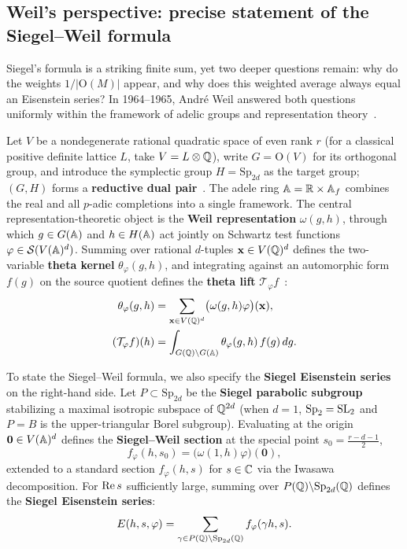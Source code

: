 \subsection{Weil's perspective: precise statement of the Siegel--Weil formula}

Siegel's formula is a striking finite sum, yet two deeper questions remain: why do the weights $1/|\mathrm O(M)|$ appear, and why does this weighted average always equal an Eisenstein series? In 1964--1965, André Weil answered both questions uniformly within the framework of adelic groups and representation theory~\cite{Weil1964,Weil1965,Li2023}.

Let $V$ be a nondegenerate rational quadratic space of even rank $r$ (for a classical positive definite lattice $L$, take $V=L\otimes\mathbb{Q}$), write $G=\mathrm O(V)$ for its orthogonal group, and introduce the symplectic group $H=\mathrm{Sp}_{2d}$ as the target group; $(G,H)$ forms a \textbf{reductive dual pair}~\cite{Howe1979,Howe1989}. The adele ring $\mathbb{A}=\mathbb{R}\times\mathbb{A}_f$ combines the real and all $p$-adic completions into a single framework. The central representation-theoretic object is the \textbf{Weil representation} $\omega(g,h)$, through which $g\in G(\mathbb{A})$ and $h\in H(\mathbb{A})$ act jointly on Schwartz test functions $\varphi\in\mathcal S(V(\mathbb{A})^d)$. Summing over rational $d$-tuples $\mathbf x\in V(\mathbb{Q})^d$ defines the two-variable \textbf{theta kernel} $\theta_\varphi(g,h)$, and integrating against an automorphic form $f(g)$ on the source quotient defines the \textbf{theta lift} $\mathcal T_\varphi f$~\cite[pp.~334--337]{Li2023}:
\[
\begin{aligned}
\theta_\varphi(g,h)&=\sum_{\mathbf x\in V(\mathbb{Q})^d}\bigl(\omega(g,h)\varphi\bigr)(\mathbf x),\\
(\mathcal T_\varphi f)(h)&=\int_{G(\mathbb{Q})\backslash G(\mathbb{A})}\theta_\varphi(g,h)\,f(g)\,dg.
\end{aligned}
\]

To state the Siegel--Weil formula, we also specify the \textbf{Siegel Eisenstein series} on the right-hand side. Let $P\subset\mathrm{Sp}_{2d}$ be the \textbf{Siegel parabolic subgroup} stabilizing a maximal isotropic subspace of $\mathbb{Q}^{2d}$ (when $d=1$, $\mathrm{Sp}_2=\operatorname{SL}_2$ and $P=B$ is the upper-triangular Borel subgroup). Evaluating at the origin $\mathbf 0\in V(\mathbb{A})^d$ defines the \textbf{Siegel--Weil section} at the special point $s_0=\frac{r-d-1}{2}$,
\[
f_\varphi(h,s_0)=\bigl(\omega(1,h)\varphi\bigr)(\mathbf 0),
\]
extended to a standard section $f_\varphi(h,s)$ for $s\in\mathbb{C}$ via the Iwasawa decomposition. For $\operatorname{Re} s$ sufficiently large, summing over $P(\mathbb{Q})\backslash\mathrm{Sp}_{2d}(\mathbb{Q})$ defines the \textbf{Siegel Eisenstein series}:
\[
E(h,s,\varphi)=\sum_{\gamma\in P(\mathbb{Q})\backslash\mathrm{Sp}_{2d}(\mathbb{Q})}f_\varphi(\gamma h,s).
\]

